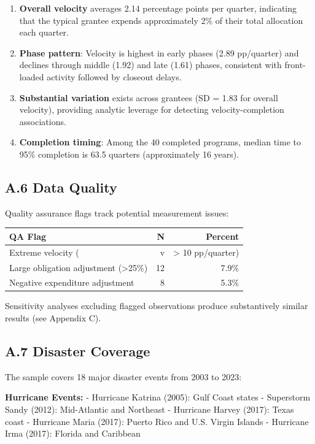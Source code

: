 \documentclass[
  12pt,
  letterpaper,
]{article}
\begin{document}
\begin{enumerate}
\def\labelenumi{\arabic{enumi}.}
\item
  \textbf{Overall velocity} averages 2.14 percentage points per quarter,
  indicating that the typical grantee expends approximately 2\% of their
  total allocation each quarter.
\item
  \textbf{Phase pattern}: Velocity is highest in early phases (2.89
  pp/quarter) and declines through middle (1.92) and late (1.61) phases,
  consistent with front-loaded activity followed by closeout delays.
\item
  \textbf{Substantial variation} exists across grantees (SD = 1.83 for
  overall velocity), providing analytic leverage for detecting
  velocity-completion associations.
\item
  \textbf{Completion timing}: Among the 40 completed programs, median
  time to 95\% completion is 63.5 quarters (approximately 16 years).
\end{enumerate}

\subsection{A.6 Data Quality}\label{a.6-data-quality}

Quality assurance flags track potential measurement issues:

\begin{longtable}[]{@{}lrr@{}}
\toprule\noalign{}
\textbf{QA Flag} & \textbf{N} & \textbf{Percent} \\
\midrule\noalign{}
\endhead
\bottomrule\noalign{}
\endlastfoot
Extreme velocity ( & v & \textgreater{} 10 pp/quarter) \\
Large obligation adjustment (\textgreater25\%) & 12 & 7.9\% \\
Negative expenditure adjustment & 8 & 5.3\% \\
\end{longtable}

Sensitivity analyses excluding flagged observations produce
substantively similar results (see Appendix C).

\subsection{A.7 Disaster Coverage}\label{a.7-disaster-coverage}

The sample covers 18 major disaster events from 2003 to 2023:

\textbf{Hurricane Events:} - Hurricane Katrina (2005): Gulf Coast states
- Superstorm Sandy (2012): Mid-Atlantic and Northeast - Hurricane Harvey
(2017): Texas coast - Hurricane Maria (2017): Puerto Rico and U.S.
Virgin Islands - Hurricane Irma (2017): Florida and Caribbean
\end{document}
